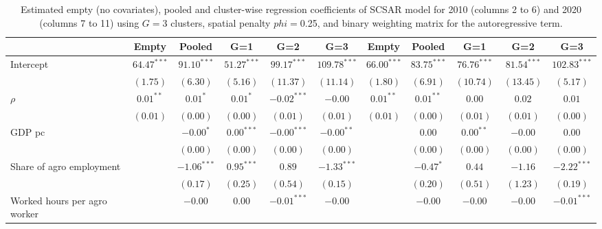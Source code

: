 
\begin{table}
\caption{Estimated empty (no covariates), pooled and cluster-wise regression coefficients of SCSAR model for 2010 (columns 2 to 6) and 2020 (columns 7 to 11) using $G=$3 clusters, spatial penalty $phi=$0.25, and binary weighting matrix for the autoregressive term.}
\begin{center}
\begin{tabular}{l c c c c c c c c c c}
\hline
 & Empty & Pooled & G=1 & G=2 & G=3 & Empty & Pooled & G=1 & G=2 & G=3 \\
\hline
Intercept                         & $64.47^{***}$ & $91.10^{***}$ & $51.27^{***}$ & $99.17^{***}$ & $109.78^{***}$ & $66.00^{***}$ & $83.75^{***}$ & $76.76^{***}$ & $81.54^{***}$ & $102.83^{***}$ \\
                                  & $(1.75)$      & $(6.30)$      & $(5.16)$      & $(11.37)$     & $(11.14)$      & $(1.80)$      & $(6.91)$      & $(10.74)$     & $(13.45)$     & $(5.17)$       \\
$\rho$                            & $0.01^{**}$   & $0.01^{*}$    & $0.01^{*}$    & $-0.02^{***}$ & $-0.00$        & $0.01^{**}$   & $0.01^{**}$   & $0.00$        & $0.02$        & $0.01$         \\
                                  & $(0.01)$      & $(0.00)$      & $(0.00)$      & $(0.01)$      & $(0.01)$       & $(0.01)$      & $(0.00)$      & $(0.01)$      & $(0.01)$      & $(0.00)$       \\
GDP pc                            &               & $-0.00^{*}$   & $0.00^{***}$  & $-0.00^{***}$ & $-0.00^{**}$   &               & $0.00$        & $0.00^{**}$   & $-0.00$       & $0.00$         \\
                                  &               & $(0.00)$      & $(0.00)$      & $(0.00)$      & $(0.00)$       &               & $(0.00)$      & $(0.00)$      & $(0.00)$      & $(0.00)$       \\
Share of agro employment          &               & $-1.06^{***}$ & $0.95^{***}$  & $0.89$        & $-1.33^{***}$  &               & $-0.47^{*}$   & $0.44$        & $-1.16$       & $-2.22^{***}$  \\
                                  &               & $(0.17)$      & $(0.25)$      & $(0.54)$      & $(0.15)$       &               & $(0.20)$      & $(0.51)$      & $(1.23)$      & $(0.19)$       \\
Worked hours per agro worker      &               & $-0.00$       & $0.00$        & $-0.01^{***}$ & $-0.00$        &               & $-0.00$       & $-0.00$       & $-0.00$       & $-0.01^{***}$  \\

\end{tabular}
\end{center}
\end{table}
